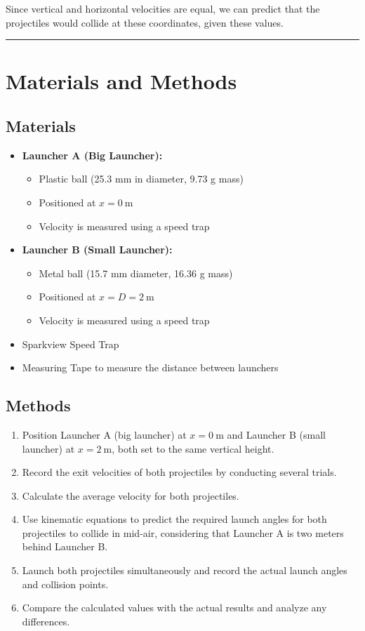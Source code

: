 \documentclass[12pt]{article}
\begin{document}
Since vertical and horizontal velocities are equal, we can predict that the projectiles would collide at these coordinates, given these values.

\noindent\rule{\textwidth}{0.5pt} %



\section{Materials and Methods}

\subsection{Materials}
\begin{itemize}
    \item \textbf{Launcher A (Big Launcher):}
    \begin{itemize}
        \item Plastic ball (25.3 mm in diameter, 9.73 g mass)
        \item Positioned at $x = 0 \ \text{m}$
        \item Velocity is measured using a speed trap
    \end{itemize}
    \item \textbf{Launcher B (Small Launcher):}
    \begin{itemize}
        \item Metal ball (15.7 mm diameter, 16.36 g mass)
        \item Positioned at $x = D = 2 \ \text{m}$
        \item Velocity is measured using a speed trap
    \end{itemize}
    \item Sparkview Speed Trap
    \item Measuring Tape to measure the distance between launchers
\end{itemize}

\subsection{Methods}
\begin{enumerate}
    \item Position Launcher A (big launcher) at $x = 0 \ \text{m}$ and Launcher B (small launcher) at $x = 2 \ \text{m}$, both set to the same vertical height.
    \item Record the exit velocities of both projectiles by conducting several trials.
    \item Calculate the average velocity for both projectiles.
    \item Use kinematic equations to predict the required launch angles for both projectiles to collide in mid-air, considering that Launcher A is two meters behind Launcher B.
    \item Launch both projectiles simultaneously and record the actual launch angles and collision points.
    \item Compare the calculated values with the actual results and analyze any differences.
\end{enumerate}
\end{document}
